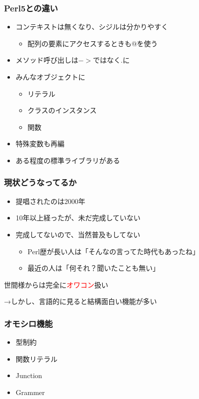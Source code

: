 \documentclass[14pt,dvipdfm,trans]{beamer}
\begin{document}
\begin{frame}
 \frametitle{Perl5との違い}

\begin{itemize}
 \item コンテキストは無くなり、シジルは分かりやすく
       \begin{itemize}
	\item 配列の要素にアクセスするときも@を使う
       \end{itemize}

 \item メソッド呼び出しは$->$ではなく.に
 \item みんなオブジェクトに
       \begin{itemize}
	\item リテラル
	\item クラスのインスタンス
	\item 関数
       \end{itemize}
 \item 特殊変数も再編
 \item ある程度の標準ライブラリがある
\end{itemize}
\end{frame}

\begin{frame}
 \frametitle{現状どうなってるか}

 \begin{itemize}
  \item 提唱されたのは2000年
  \item 10年以上経ったが、未だ完成していない
  \item 完成してないので、当然普及もしてない
	\begin{itemize}
	 \item Perl歴が長い人は「そんなの言ってた時代もあったね」
	 \item 最近の人は「何それ？聞いたことも無い」
	\end{itemize}
 \end{itemize}
 \begin{center}
  世間様からは完全に{\huge\textcolor{red}{オワコン}}扱い 
 \end{center}

\vspace*{2zh}
→しかし、言語的に見ると結構面白い機能が多い
\end{frame}

\begin{frame}
 \frametitle{オモシロ機能}

\begin{itemize}
 \item 型制約
 \item 関数リテラル
 \item Junction
 \item Grammer
\end{itemize}
\end{frame}
\end{document}
